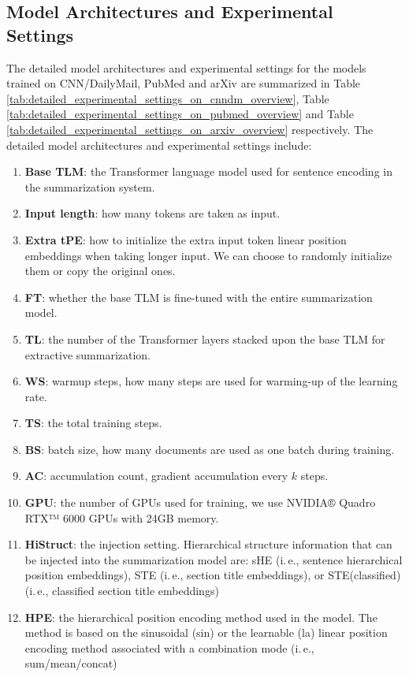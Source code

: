 \documentclass[11pt]{article}
\begin{document}
\subsection{Model Architectures  and Experimental Settings}
\label{subsec:Experimental settings}
The detailed model architectures and experimental settings for the models trained on CNN/DailyMail, PubMed and arXiv are summarized in Table \ref{tab:detailed_experimental_settings_on_cnndm_overview}, Table \ref{tab:detailed_experimental_settings_on_pubmed_overview} and Table \ref{tab:detailed_experimental_settings_on_arxiv_overview} respectively. 
The detailed model architectures and experimental settings include:
\begin{enumerate}[leftmargin=0pt,itemsep=0pt,parsep=0pt]
 \item[] \textbf{Base TLM}: the Transformer language model used for sentence encoding in the summarization system.
 \item[] \textbf{Input length}: how many tokens are taken as input.
 \item[] \textbf{Extra tPE}: how to initialize the extra input token linear position embeddings when taking longer input. We can choose to randomly initialize them or copy the original ones.
 \item[] \textbf{FT}: whether the base TLM is fine-tuned with the entire summarization model.
 \item[] \textbf{TL}: the number of the Transformer layers stacked upon the base TLM for extractive summarization.
 \item[] \textbf{WS}: warmup steps, how many steps are used for warming-up of the learning rate.
 \item[] \textbf{TS}: the total training steps.
 \item[] \textbf{BS}: batch size, how many documents are used as one batch during training.
 \item[] \textbf{AC}: accumulation count, gradient accumulation every $k$ steps.
 \item[] \textbf{GPU}: the number of GPUs used for training, we use NVIDIA® Quadro RTX™ 6000 GPUs with 24GB memory.
 \item[] \textbf{HiStruct}: the injection setting. Hierarchical structure information that can be injected into the summarization model are: sHE (i.\,e., sentence hierarchical position embeddings), STE (i.\,e., section title embeddings), or  STE(classified) (i.\,e., classified section title embeddings)
 \item[] \textbf{HPE}: the hierarchical position encoding method used in the model. The method is based on the sinusoidal (sin) or the learnable (la) linear position encoding method associated with a combination mode (i.\,e., sum/mean/concat)

\end{enumerate}
\end{document}
